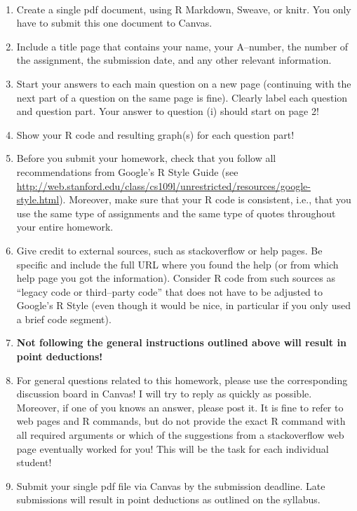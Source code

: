 \documentclass[12pt,letterpaper,final]{article}
\begin{document}
\newpage


~\\


\begin{enumerate}
\item Create a single pdf document, using R Markdown, Sweave, or knitr.
You only have to submit this one document to Canvas.

\item Include a title page that contains your name, your A--number, the number of
the assignment, the submission date, and any other relevant information.

\item Start your answers to each main question on a new page (continuing with the next
part of a question on the same page is fine). 
Clearly label each question and question part. Your answer to question (i) should start on page 2!

\item Show your R code and resulting graph(s) for each question part!

\item Before you submit your homework, check that you
follow all recommendations from Google's R Style Guide
(see \url{http://web.stanford.edu/class/cs109l/unrestricted/resources/google-style.html}). 
Moreover, make sure that your R code is consistent, i.e., that you use the same
type of assignments and the same type of quotes throughout your entire homework.

\item Give credit to external sources, such as stackoverflow or help pages. Be specific
and include the full URL where you found the help (or from which help page you got 
the information). Consider R code from such sources as ``legacy code or third--party code'' 
that does not have to be adjusted to Google's R Style (even though it would be nice,
in particular if you only used a brief code segment).

\item {\bf Not following the general instructions outlined above will result in point deductions!}

\item For general questions related to this homework, please
use the corresponding discussion board in Canvas! I will try to
reply as quickly as possible. Moreover, if one of you knows
an answer, please post it. It is fine to refer to web pages
and R commands, but do not provide the exact R command with all required arguments
or which of the suggestions from a stackoverflow web page eventually worked for you! 
This will be the task for each individual student!

\item Submit your single pdf file via Canvas by the submission deadline.
Late submissions will result in point deductions as outlined on the syllabus.

\end{enumerate}
\end{document}
